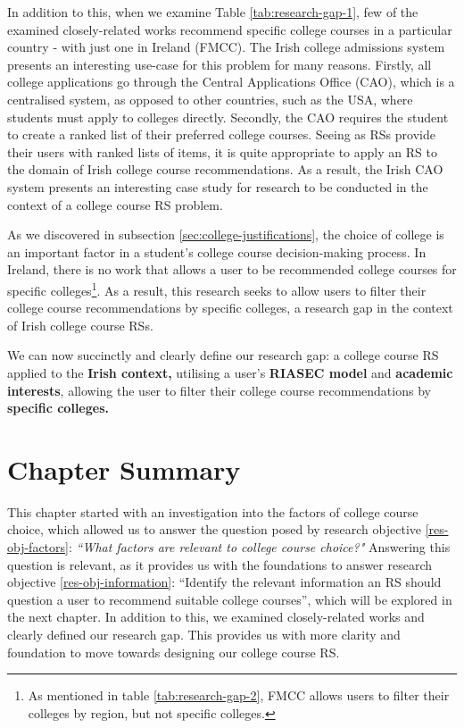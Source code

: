 In addition to this, when we examine Table \ref{tab:research-gap-1}, few of the examined closely-related works
recommend specific college courses in a particular country - with just one in Ireland (FMCC).
The Irish college admissions system presents an interesting use-case for this problem for many reasons.
Firstly, all college applications go through the Central Applications Office (CAO), which is a centralised system,
as opposed to other countries, such as the USA, where students must apply to colleges directly.
Secondly, the CAO requires the student to create a ranked list of their preferred college courses.
Seeing as RSs provide their users with ranked lists of items, 
it is quite appropriate to apply an RS to the domain of Irish college course recommendations.
As a result, the Irish CAO system presents an interesting case study for research to be conducted in the context of a college course RS problem.

As we discovered in subsection \ref{sec:college-justifications},
the choice of college is an important factor in a student's college course decision-making process.
In Ireland, there is no work that allows a user to be recommended college courses for specific colleges\footnote{As mentioned in table \ref{tab:research-gap-2}, FMCC allows users to filter their colleges by region, but not specific colleges.}.
As a result, this research seeks to allow users to filter their college course recommendations by specific colleges,
a research gap in the context of Irish college course RSs.

We can now succinctly and clearly define our research gap: a college course RS applied to the \textbf{Irish context,}
utilising a user's \textbf{RIASEC model} and \textbf{academic interests}, allowing the user to filter their college course recommendations by \textbf{specific colleges.}

\section{Chapter Summary}
\label{sec:literature-review-summary}

This chapter started with an investigation into the factors of college course choice,
which allowed us to answer the question posed by research objective \ref{res-obj-factors}: \emph{``What factors are relevant to college course choice?"}
Answering this question is relevant, as it provides us with the foundations to answer research objective \ref{res-obj-information}:
``Identify the relevant information an RS should question a user to recommend suitable college courses'',
which will be explored in the next chapter. In addition to this, we examined closely-related works and clearly defined our research gap.
This provides us with more clarity and foundation to move towards designing our college course RS.
